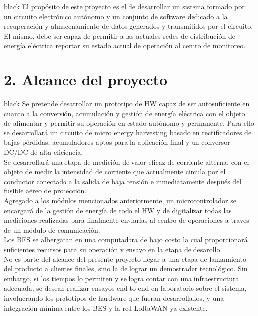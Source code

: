 \documentclass[11pt]{charter}
\begin{document}
\begin{consigna}{black}
El propósito de este proyecto es el de desarrollar un sistema formado por un circuito electrónico autónomo y un conjunto de software dedicado a la recuperación y almacenamiento de datos generados y transmitidos por el circuito.\\
El mismo, debe ser capaz de permitir a las actuales redes de distribución de energía eléctrica reportar su estado actual de operación al centro de monitoreo.
\end{consigna}

\section{2. Alcance del proyecto}
\label{sec:alcance}

\begin{consigna}{black}
Se pretende desarrollar un prototipo de HW capaz de ser autosuficiente en cuanto a la conversión, acumulación y gestión de energía eléctrica con el objeto de alimentar y permitir su operación en estado autónomo y permanente. Para ello se desarrollará un circuito de micro energy harvesting basado en rectificadores de bajas pérdidas, acumuladores aptos para la aplicación final y un conversor DC/DC de alta eficiencia.\\
Se desarrollará una etapa de medición de valor eficaz de corriente alterna, con el objeto de medir la intensidad de corriente que actualmente circula por el conductor conectado a la salida de baja tensión e inmediatamente después del fusible aéreo de protección.\\
Agregado a los módulos mencionados anteriormente, un microcontrolador se encargará de la gestión de energía de todo el HW y de digitalizar todas las mediciones realizadas para finalmente enviarlas al centro de operaciones a traves de un módulo de comunicación.\\
Los BES se albergaran en una computadora de bajo costo la cual proporcionará suficientes recursos para su operación y ensayo en la etapa de desarollo.\\

No es parte del alcance del presente proyecto llegar a una etapa de lanzamiento del producto a clientes finales, sino la de lograr un demostrador tecnológico. Sin embargo, si los tiempos lo permiten y se logra contar con una infraestructura adecuada, se desean realizar ensayos end-to-end en laboratorio sobre el sistema, involucrando los prototipos de hardware que fueran desarrollados, y una integración mínima entre los BES y la red LoRaWAN ya existente.\\
\end{consigna}
\end{document}
